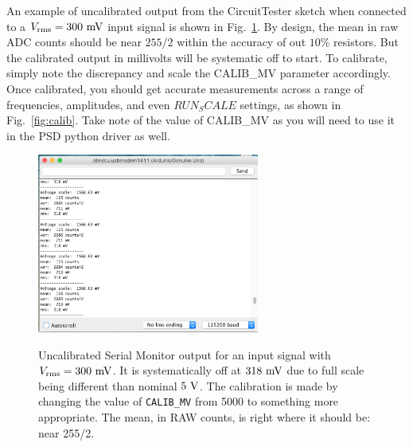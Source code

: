 \documentclass[12pt]{article}
\begin{document}
An example of uncalibrated output from the CircuitTester sketch when connected to a $V_{\rm rms} = 300~\rm mV$ input signal is shown in Fig.~\ref{fig:uncalib}.   By design, the mean in raw ADC counts should be near $255/2$ within the accuracy of out $10\%$ resistors.  But the calibrated output in millivolts will be systematic off to start.  To calibrate, simply note the discrepancy and scale the CALIB\_MV parameter accordingly.  Once calibrated, you should get accurate measurements across a range of frequencies, amplitudes, and even $RUN_SCALE$ settings, as shown in Fig.~\ref{fig:calib}.  Take note of the value of CALIB\_MV as you will need to use it in the PSD python driver as well.

\begin{figure}[htbp]
\begin{center}
{\includegraphics[width=0.65\textwidth]{figs/uncalibrated.png}}
\end{center}
\caption{\label{fig:uncalib} Uncalibrated Serial Monitor output for an input signal with $V_{\rm rms} = 300~\rm mV$.   It is systematically off at $318~\rm mV$ due to full scale being different than nominal $5~\rm V$.  The calibration is made by changing the value of {\tt CALIB\_MV} from 5000 to something more appropriate.
The mean, in RAW counts, is right where it should be:  near 255/2.}
\end{figure}
\end{document}
